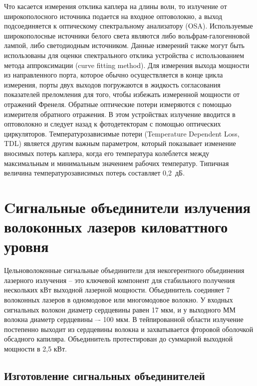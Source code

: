 Что касается измерения отклика каплера на длины волн, то излучение от широкополосного источника подается на входное оптоволокно, а выход подсоединяется к оптическому спектральному анализатору (OSA). Используемые широкополосные источники белого света являются либо вольфрам-галогенновой лампой, либо светодиодным источником. Данные измерений также могут быть использованы для оценки спектрального отклика устройства с использованием метода аппроксимации (curve fitting method). Для измерения выхода мощности из направленного порта, которое обычно осуществляется в конце цикла измерения, порты двух выходов погружаются в жидкость согласования показателей преломления для того, чтобы избежать измеренной мощности от отражений Френеля. Обратные оптические потери измеряются с помощью измерителя обратного отражения. В этом устройствах излучение вводится в оптоволокно и следует назад к фотодетекторам с помощью оптических циркуляторов. Температурозависимые потери (Temperature Dependent Loss, TDL) является другим важным параметром, который показывает изменение вносимых потерь каплера, когда его температура колеблется между максимальным и минимальным значением рабочих температур. Типичная величина температурозависимых потерь составляет 0,2~дБ.

\newpage
\section{Cигнальные объединители излучения волоконных лазеров киловаттного уровня}

Цельноволоконные сигнальные объединители для некогерентного объединения лазерного излучения -- это ключевой компонент для стабильного получения нескольких кВт выходной лазерной мощности. Объединитель соединяет 7 волоконных лазеров в одномодовое или многомодовое волокно. У входных сигнальных волокон диаметр сердцевины равен 17 мкм, и у выходного ММ волокна диаметр сердцевины –- 100 мкм. В тейпированной области излучение постепенно выходит из сердцевины волокна и захватывается фторовой оболочкой обсадного капиляра. Объединитель протестирован до суммарной выходной мощности в 2,5 кВт.

\subsection{Изготовление сигнальных объединителей}


